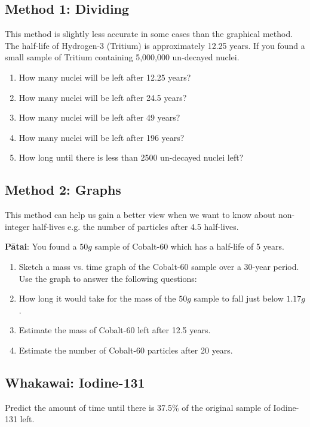 \documentclass[12pt]{report}
\begin{document}
{\subsection{Method 1: Dividing}
This method is slightly less accurate in some cases than the graphical method. The half-life of Hydrogen-3 (Tritium) is approximately 12.25 years. If you found a small sample of Tritium containing 5,000,000 un-decayed nuclei.

\begin{enumerate}[itemsep=1cm]
	\item How many nuclei will be left after 12.25 years?
	\item How many nuclei will be left after 24.5 years?
	\item How many nuclei will be left after 49 years?
	\item How many nuclei will be left after 196 years?
	\item How long until there is less than 2500 un-decayed nuclei left?\vspace{1cm}
\end{enumerate}

\subsection{Method 2: Graphs}
This method can help us gain a better view when we want to know about non-integer half-lives e.g. the number of particles after 4.5 half-lives.

\noindent\textbf{Pātai}: You found a $50g$ sample of Cobalt-60 which has a half-life of 5 years.

\begin{enumerate}
    \item Sketch a mass vs. time graph of the Cobalt-60 sample over a 30-year period. Use the graph to answer the following questions:\vspace{10cm}
	\item How long it would take for the mass of the $50g$ sample to fall just below $1.17g$.\vspace{1cm}
	\item Estimate the mass of Cobalt-60 left after 12.5 years.\vspace{1cm}
	\item Estimate the number of Cobalt-60 particles after 20 years.\vspace{1cm}
\end{enumerate}

\subsection{Whakawai: Iodine-131}
Predict the amount of time until there is 37.5\% of the original sample of Iodine-131 left.

}
\end{document}
